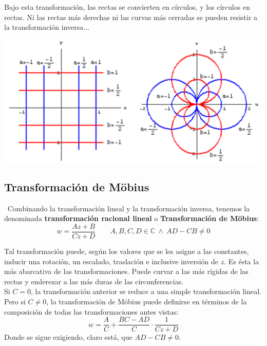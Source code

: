 \documentclass[12pt]{article}
\theoremstyle{definition}
\theoremstyle{theorem}
\theoremstyle{corolary}
\begin{document}
Bajo esta transformaci\'on, las rectas se convierten en c\'irculos, y los c\'irculos en rectas. Ni las rectas m\'as derechas ni las curvas m\'as cerradas se pueden resistir a la transformaci\'on inversa...\\
\begin{center}
	\includegraphics[scale=0.5]{reciprocal.png}
\end{center}


\subsection{Transformaci\'on de M\"obius}\
Combinando la transformaci\'on lineal y la transformaci\'on inversa, tenemos la denominada \textbf{transformaci\'on racional lineal} o \textbf{Transformaci\'on de M\"obius}: $$w = \frac{Az + B}{Cz + D} \qquad A, B,C,D \in \mathbb{C}\: \land\: AD - CB \neq 0$$

Tal transformaci\'on puede, seg\'un los valores que se les asigne a las constantes, inducir una rotaci\'on, un escalado, traslaci\'on e inclusive inversi\'on de $z$. Es \'esta la m\'as abarcativa de las transformaciones. Puede curvar a las m\'as r\'igidas de las rectas y enderezar a las m\'as duras de las circunferencias.\\

Si $C=0$, la transformaci\'on anterior se reduce a una simple transformaci\'on lineal. Pero si $C\neq 0$, la transformaci\'on de M\"obius puede definirse en t\'erminos de la composici\'on de todas las transformaciones antes vistas: $$w = \frac{A}{C} + \frac{BC - AD}{C} \cdot \frac{1}{Cz+D}$$
Donde se sigue exigiendo, claro est\'a, que $AD-CB \neq 0$.\\
\end{document}

